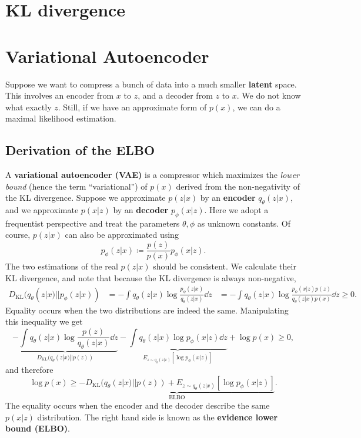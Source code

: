 \documentclass[hyperref, a4paper, 12pt]{report}
\newcommand*{\concept}[1]{{\textbf{#1}}}
\def\\{}%
\def\mathbb#1{#1}%
\begin{document}
\section{KL divergence}

\section{Variational Autoencoder}

Suppose we want to compress a bunch of data into a much smaller \concept{latent} space.
This involves an encoder from $x$ to $z$, and a decoder from $z$ to $x$.
We do not know what exactly $z$.
Still, if we have an approximate form of $p(x)$,
we can do a maximal likelihood estimation.

\subsection{Derivation of the ELBO}

A \concept{variational autoencoder (VAE)} is a compressor which maximizes the \emph{lower bound}
(hence the term ``variational'') of $p(x)$ derived from the non-negativity of the KL divergence.
Suppose we approximate $p(z|x)$ by an \concept{encoder} $q_\theta(z | x)$,
and we approximate $p(x|z)$ by an \concept{decoder} $p_\phi(x | z)$.
Here we adopt a frequentist perspective and treat the parameters $\theta, \phi$ as unknown constants.
Of course, $p(z | x)$ can also be approximated using 
\begin{equation}
    p_\phi(z | x) \coloneqq \frac{p(z)}{p(x)} p_\phi(x | z).
\end{equation}
The two estimations of the real $p(z | x)$ should be consistent.
We calculate their KL divergence, and note that because the KL divergence is always non-negative,
\begin{equation}
    \begin{aligned}
        D_{\text{KL}}(q_\theta(z|x) || p_\phi(z|x)) &= - \int q_\theta(z|x) \log \frac{p_\phi(z|x)}{q_\theta(z|x)} \dd{z} \\
        &= - \int q_\theta(z|x) \log \frac{p_\phi(x|z) p(z)}{q_\theta(z|x) p(x)} \dd{z} \geq 0.
    \end{aligned}
\end{equation} 
Equality occurs when the two distributions are indeed the same.
Manipulating this inequality we get 
\[
    \underbrace{- \int q_\theta(z|x) \log \frac{p(z)}{q_\theta(z|x)} \dd{z}}_{D_{\text{KL}}(q_\theta(z|x) ||p(z))} - \underbrace{\int q_\theta(z|x)  \log p_\phi(x|z) \dd{z}}_{\mathbb{E}_{z\sim q_\theta(z|x)}[\log p_\phi(x|z)]} + \log p(x) \geq 0,
\]
and therefore 
\begin{equation}
    \log p(x) \geq \underbrace{- D_{\text{KL}}(q_\theta(z|x) ||p(z)) + \mathbb{E}_{z\sim q_\theta(z|x)}[\log p_\phi(x|z)]}_{\text{ELBO}}.
    \label{eq:loss.vae.gaussian.elbo}
\end{equation}
The equality occurs when the encoder and the decoder describe the same $p(x|z)$ distribution.
The right hand side is known as the \concept{evidence lower bound (ELBO)}.
\end{document}
